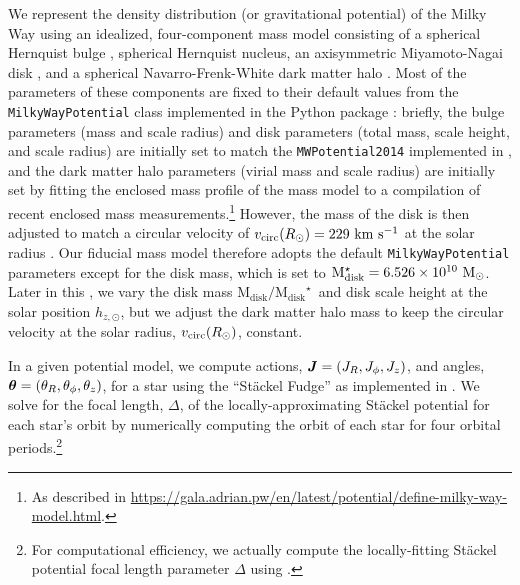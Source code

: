 \documentclass[modern]{aastex63}
\newcommand{\mdisk}{\ensuremath{\mathrm{M}_\mathrm{disk}}}
\newcommand{\mratio}{\ensuremath{\mdisk / \mdisk^\star}}
\newcommand{\hz}{\ensuremath{h_{z, \odot}}}
\begin{document}
We represent the density distribution (or gravitational potential) of the
Milky Way using an idealized, four-component mass model consisting of a
spherical Hernquist bulge \citep{Hernquist:1990}, spherical Hernquist nucleus,
an axisymmetric Miyamoto-Nagai disk \citep{Miyamoto:1975}, and a spherical
Navarro-Frenk-White dark matter halo \citep{Navarro:1996}.
Most of the parameters of these components are fixed to their default values
from the \texttt{MilkyWayPotential} class implemented in the 
Python package \citep[v1.2;][]{gala}:
briefly, the bulge parameters (mass and scale radius) and disk parameters (total
mass, scale height, and scale radius) are initially set to match the
\texttt{MWPotential2014} implemented in  \citep{Bovy:2015}, and
the dark matter halo parameters (virial mass and scale radius) are initially set
by fitting the enclosed mass profile of the mass model to a compilation of
recent enclosed mass measurements.\footnote{As described in
\url{https://gala.adrian.pw/en/latest/potential/define-milky-way-model.html}.}
However, the mass of the disk is then adjusted to match a circular velocity of
$v_{\rm circ}(R_\odot) = 229~\mathrm{km}~\mathrm{s}^{-1}$ at the solar radius \citep{Eilers:2019}.
Our fiducial mass model therefore adopts the default \texttt{MilkyWayPotential}
parameters except for the disk mass, which is set to $\mdisk^\star = 6.526
\times 10^{10}~\Msun$.
Later in this \documentname, we vary the disk mass \mratio\ and disk scale
height at the solar position \hz, but we adjust the dark matter halo mass to
keep the circular velocity at the solar radius, $v_{\rm circ}(R_\odot)$,
constant.

In a given potential model, we compute actions, $\boldsymbol{J} = (J_R, J_\phi, J_z)$,
and angles, $\boldsymbol{\theta} = (\theta_R, \theta_\phi, \theta_z)$, for a star using
the ``St\"ackel Fudge'' \citep{Binney:2012, Sanders:2012} as implemented in
 \citep{Bovy:2015}.
We solve for the focal length, $\Delta$, of the locally-approximating St\"ackel
potential for each star's orbit by numerically computing the orbit of each star
for four orbital periods.\footnote{For computational efficiency, we actually
compute the locally-fitting St\"ackel potential focal length parameter $\Delta$
\citep{Sanders:2012} using  \citep{gala}.}
\end{document}
